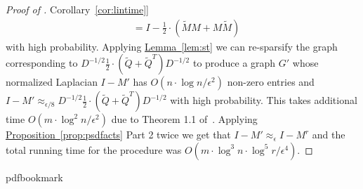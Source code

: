 \documentclass[11pt]{article}
\numberwithin{equation}{section}
\theoremstyle{definition}
\theoremstyle{plain}
\newcommand{\expref}[2]{\hyperref[#2]{#1~\ref{#2}}}
\newcommand{\wt}{\widetilde}   %
\numberwithin{myalgctr}{section}
\theoremstyle{named}
\begin{document}
\begin{proof}[Proof of \expref{Corollary}{cor:lintime}]
\begin{align*}
&=I-\frac{1}{2}\cdot(\wt{M}M+M\wt{M})
\end{align*}
with high probability. Applying \expref{Lemma}{lem:st} we can re-sparsify the graph corresponding to $D^{-1/2}\frac{1}{2}\cdot(\wt{Q}+\wt{Q}^T)D^{-1/2}$ to produce a graph $G'$ whose normalized Laplacian $I-M'$ has $O(n\cdot \log n/\epsilon^2)$ non-zero entries and $I-M'\approx_{\epsilon/8}D^{-1/2}\frac{1}{2}\cdot(\wt{Q}+\wt{Q}^T)D^{-1/2}$ with high probability. This takes additional time $O(m\cdot \log^2 n/\epsilon^2)$ due to Theorem 1.1 of~\cite{KPPS16}. Applying \expref{Proposition}{prop:psdfacts} Part 2 twice we get that $I-M'\approx_{\epsilon}I-M^r$ and the total running time for the procedure was $O(m\cdot \log^3 n\cdot \log^5 r/\epsilon^4)$.
\end{proof}






\newcommand{\prelim}{Preliminary version in\ }
\providecommand{\bibhead}[1]{}
\expandafter\ifx\csname pdfbookmark\endcsname\relax%
  \providecommand{\tocrefpdfbookmark}{}
\else\providecommand{\tocrefpdfbookmark}{%
   \hypertarget{tocreferences}{}%
   \pdfbookmark[1]{References}{tocreferences}}%
\fi
\end{document}
